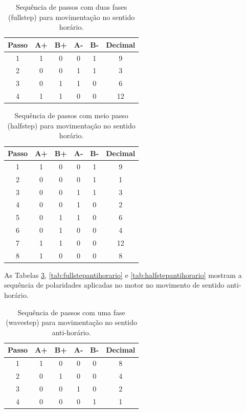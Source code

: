 \begin{table}[H]
    \footnotesize
    \centering
    \caption{Sequência de passos com duas fases (fullstep) para movimentação no sentido horário.}
    \begin{tabular}{cccccc}
        \hline
        \textbf{Passo} & \textbf{A+} & \textbf{B+} & \textbf{A-} & \textbf{B-} & \textbf{Decimal}\\
        \hline
        1 & 1 & 0 & 0 & 1 & 9\\
        2 & 0 & 0 & 1 & 1 & 3\\
        3 & 0 & 1 & 1 & 0 & 6\\
        4 & 1 & 1 & 0 & 0 & 12\\
        \hline       
    \end{tabular}
    \label{tab:fullstephorario}
\end{table}

\begin{table}[H]
    \footnotesize
    \centering
    \caption{Sequência de passos com meio passo (halfstep) para movimentação no sentido horário.}
    \begin{tabular}{cccccc}
        \hline
        \textbf{Passo} & \textbf{A+} & \textbf{B+} & \textbf{A-} & \textbf{B-} & \textbf{Decimal}\\
        \hline
        1 & 1 & 0 & 0 & 1 & 9\\
        2 & 0 & 0 & 0 & 1 & 1\\
        3 & 0 & 0 & 1 & 1 & 3\\
        4 & 0 & 0 & 1 & 0 & 2\\
        5 & 0 & 1 & 1 & 0 & 6\\
        6 & 0 & 1 & 0 & 0 & 4\\
        7 & 1 & 1 & 0 & 0 & 12\\
        8 & 1 & 0 & 0 & 0 & 8\\
        \hline       
    \end{tabular}
    \label{tab:halfstephorario}
\end{table}

As Tabelas \ref{tab:wavestepantihorario}, \ref{tab:fullstepantihorario} e \ref{tab:halfstepantihorario} 
mostram a sequência de polaridades aplicadas no motor no movimento de sentido anti-horário.

\begin{table}[H]
    \footnotesize
    \centering
    \caption{Sequência de passos com uma fase (wavestep) para movimentação no sentido anti-horário.}
    \begin{tabular}{cccccc}
        \hline
        \textbf{Passo} & \textbf{A+} & \textbf{B+} & \textbf{A-} & \textbf{B-} & \textbf{Decimal}\\
        \hline
        1 & 1 & 0 & 0 & 0 & 8\\
        2 & 0 & 1 & 0 & 0 & 4\\
        3 & 0 & 0 & 1 & 0 & 2\\
        4 & 0 & 0 & 0 & 1 & 1\\
        \hline       
    \end{tabular}
    \label{tab:wavestepantihorario}
\end{table}

